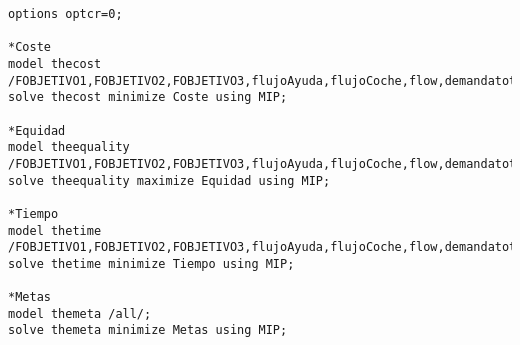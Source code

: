 \documentclass[]{article}
\begin{document}
\begin{lstlisting}
options optcr=0;

*Coste
model thecost /FOBJETIVO1,FOBJETIVO2,FOBJETIVO3,flujoAyuda,flujoCoche,flow,demandatot,cargacapa,maxbudget,resTiempo,res8/;
solve thecost minimize Coste using MIP;

*Equidad
model theequality /FOBJETIVO1,FOBJETIVO2,FOBJETIVO3,flujoAyuda,flujoCoche,flow,demandatot,cargacapa,maxbudget,resTiempo,res8/;
solve theequality maximize Equidad using MIP;

*Tiempo
model thetime /FOBJETIVO1,FOBJETIVO2,FOBJETIVO3,flujoAyuda,flujoCoche,flow,demandatot,cargacapa,maxbudget,resTiempo,res8/;
solve thetime minimize Tiempo using MIP;

*Metas
model themeta /all/;
solve themeta minimize Metas using MIP;
\end{lstlisting}
\end{document}
